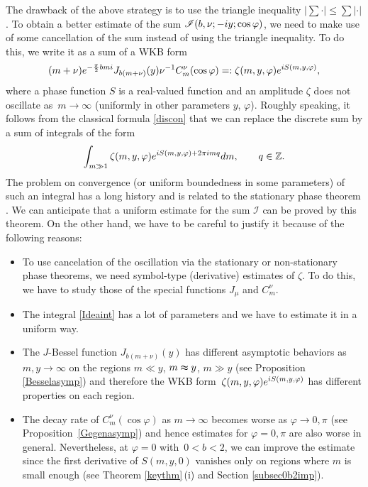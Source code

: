\documentclass[10pt,a4paper]{article}
\numberwithin{equation}{section}
\def\f{\varphi}
\def\m{\mu}
\def\n{\nu}
\def\z{\zeta}
\newcommand{\sI}{\mathscr{I}}
\begin{document}
The drawback of the above strategy is to use the triangle inequality $|\sum \cdot|\leq \sum|\cdot|$.
To obtain a better estimate of the sum $\sI(b,\nu;-{\rm i}y;\cos\f)$, we need to make use of some cancellation of the sum instead of using the triangle inequality.
To do this, we write it as a sum of a WKB form
\begin{align*}
(m+\nu){\rm e}^{-\frac{\pi}{2}bm{\rm i}}J_{b(m+\n)}(y)\n^{-1}C^{\nu}_m(\cos\f)=:\z(m,y,\f){\rm e}^{{\rm i}S(m,y,\f)},
\end{align*}
where a phase function $S$ is a real-valued function and an amplitude $\z$ does not oscillate as~${m\to \infty}$ (uniformly in other parameters $y$, $\f$). Roughly speaking, it follows from the classical formula \eqref{discon} that we can replace the discrete sum by a sum of integrals of the form
\begin{align}\label{Ideaint}
\int_{m\gg 1}\z(m,y,\f){\rm e}^{{\rm i}S(m,y,\f)+2\pi {\rm i} mq} {\rm d}m,\qquad q\in\mathbb{Z}.
\end{align}
The problem on convergence (or uniform boundedness in some parameters) of such an integral has a long history and is related to the stationary phase theorem \cite{S}. We can anticipate that a uniform estimate for the sum $\sI$ can be proved by this theorem. On the other hand, we have to be careful to justify it because of the following reasons:
\begin{itemize}\itemsep=0pt
\item To use cancelation of the oscillation via the stationary or non-stationary phase theorems, we need symbol-type (derivative) estimates of $\z$. To do this, we have to study those of the special functions $J_{\m}$ and $C_{m}^{\n}$.

\item The integral \eqref{Ideaint} has a lot of parameters and we have to estimate it in a uniform way.

\item The $J$-Bessel function $J_{b(m+\n)}(y)$ has different asymptotic behaviors as $m,y\to \infty$ on the regions $m\ll y$, $m\thickapprox y$, $m\gg y$ (see Proposition \ref{Besselasymp}) and therefore the WKB form~${\z(m,y,\f){\rm e}^{{\rm i}S(m,y,\f)}}$ has different properties on each region.

\item The decay rate of $C^{\nu}_m(\cos\f)$ as $m\to \infty$ becomes worse as $\f\to 0,\pi$ (see Proposition~\ref{Gegenasymp}) and hence estimates for $\f=0,\pi$ are also worse in general. Nevertheless, at $\f=0$ with~${0<b<2}$, we can improve the estimate since the first derivative of $S(m,y,0)$ vanishes only on regions where $m$ is small enough (see Theorem \ref{keythm}\,(i) and Section \ref{subsec0b2imp}).
\end{itemize}
\end{document}
